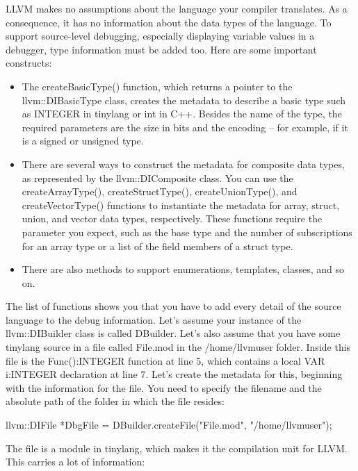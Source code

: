 LLVM makes no assumptions about the language your compiler translates. As a consequence, it has no information about the data types of the language. To support source-level debugging, especially displaying variable values in a debugger, type information must be added too. Here are some important constructs:

\begin{itemize}
\item
The createBasicType() function, which returns a pointer to the llvm::DIBasicType class, creates the metadata to describe a basic type such as INTEGER in tinylang or int in C++. Besides the name of the type, the required parameters are the size in bits and the encoding – for example, if it is a signed or unsigned type.

\item
There are several ways to construct the metadata for composite data types, as represented by the llvm::DIComposite class. You can use the createArrayType(), createStructType(), createUnionType(), and createVectorType() functions to instantiate the metadata for array, struct, union, and vector data types, respectively. These functions require the parameter you expect, such as the base type and the number of subscriptions for an array type or a list of the field members of a struct type.

\item
There are also methods to support enumerations, templates, classes, and so on.
\end{itemize}

The list of functions shows you that you have to add every detail of the source language to the debug information. Let’s assume your instance of the llvm::DIBuilder class is called DBuilder. Let’s also assume that you have some tinylang source in a file called File.mod in the /home/llvmuser folder. Inside this file is the Func():INTEGER function at line 5, which contains a local VAR i:INTEGER declaration at line 7. Let’s create the metadata for this, beginning with the information for the file. You need to specify the filename and the absolute path of the folder in which the file resides:

\begin{cpp}
llvm::DIFile *DbgFile = DBuilder.createFile("File.mod",
                                            "/home/llvmuser");
\end{cpp}

The file is a module in tinylang, which makes it the compilation unit for LLVM. This carries a lot of information:

